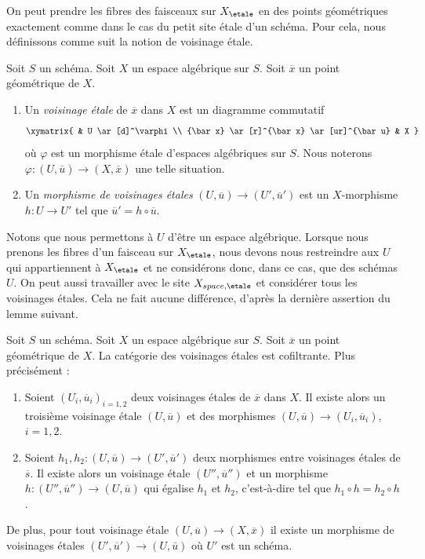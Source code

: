 \noindent
On peut prendre les fibres des faisceaux sur $X_\etale$
en des points géométriques exactement comme dans le cas
du petit site \'etale d'un schéma. Pour cela, nous
définissons comme suit la notion de voisinage \'etale.

\begin{definition}
\label{definition-etale-neighbourhood}
Soit $S$ un schéma. Soit $X$ un espace algébrique sur $S$.
Soit $\overline{x}$ un point géométrique de $X$.
\begin{enumerate}
\item Un {\it voisinage \'etale} de $\overline{x}$
dans $X$ est un diagramme commutatif
$$
\xymatrix{
& U \ar[d]^\varphi \\
{\bar x} \ar[r]^{\bar x} \ar[ur]^{\bar u} & X
}
$$
où $\varphi$ est un morphisme \'etale d'espaces algébriques sur $S$.
Nous noterons $\varphi : (U, \overline{u}) \to (X, \overline{x})$
une telle situation.
\item Un {\it morphisme de voisinages \'etales}
$(U, \overline{u}) \to (U', \overline{u}')$
est un $X$-morphisme $h : U \to U'$
tel que $\overline{u}' = h \circ \overline{u}$.
\end{enumerate}
\end{definition}

\noindent
Notons que nous permettons à $U$ d'être un espace algébrique. Lorsque nous
prenons les fibres d'un faisceau sur $X_\etale$, nous devons nous restreindre aux $U$ qui
appartiennent à $X_\etale$ et ne considérons donc, dans ce cas,
que des schémas $U$. On peut aussi travailler avec le site
$X_{space, \etale}$ et considérer tous les voisinages \'etales. Cela
ne fait aucune différence, d'après la dernière assertion du lemme suivant.

\begin{lemma}
\label{lemma-cofinal-etale}
Soit $S$ un schéma. Soit $X$ un espace algébrique sur $S$.
Soit $\overline{x}$ un point géométrique de $X$.
La catégorie des voisinages \'etales est cofiltrante. Plus précisément :
\begin{enumerate}
\item Soient $(U_i, \overline{u}_i)_{i = 1, 2}$ deux voisinages \'etales de
$\overline{x}$ dans $X$. Il existe alors un troisième voisinage \'etale
$(U, \overline{u})$ et des morphismes
$(U, \overline{u}) \to (U_i, \overline{u}_i)$, $i = 1, 2$.
\item Soient $h_1, h_2: (U, \overline{u}) \to (U', \overline{u}')$ deux
morphismes entre voisinages \'etales de $\overline{s}$. Il existe alors un
voisinage \'etale $(U'', \overline{u}'')$ et un morphisme
$h : (U'', \overline{u}'') \to (U, \overline{u})$
qui égalise $h_1$ et $h_2$, c'est-à-dire tel que
$h_1 \circ h = h_2 \circ h$.
\end{enumerate}
De plus, pour tout voisinage \'etale
$(U, \overline{u}) \to (X, \overline{x})$
il existe un morphisme de voisinages \'etales
$(U', \overline{u}') \to (U, \overline{u})$
où $U'$ est un schéma.
\end{lemma}

